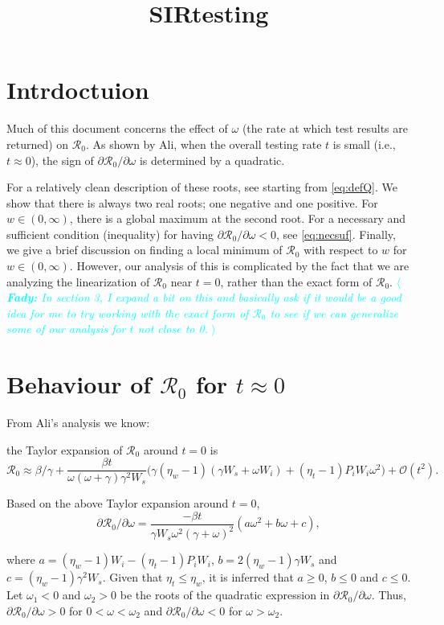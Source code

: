 \documentclass{article}
\title{SIRtesting}
\newcommand{\fady}[1]{\textcolor{cyan}{$\langle${\slshape{\bfseries Fady:} #1 }$\rangle$}}
\newcommand{\Rnum}{\mathcal{R}_0}
\begin{document}
\maketitle

\section{Intrdoctuion}

Much of this document concerns the effect of $\omega$ (the rate at which test results are returned) on $\Rnum$. As shown by Ali, when the overall testing rate $t$ is small (i.e., $t \approx 0$), the sign of $\partial{\Rnum}/\partial{\omega}$ is determined by a quadratic. 

For a relatively clean description of these roots, see starting from \cref{eq:defQ}. We show that there is always two real roots; one negative and one positive. For $w \in (0, \infty)$, there is a global maximum at the second root. For a necessary and sufficient condition (inequality) for having $\partial{\Rnum}/\partial{\omega} < 0$, see \cref{eq:necsuf}. Finally, we give a brief discussion on finding a local minimum of $\Rnum$ with respect to $w$ for $w \in (0,\infty)$. However, our analysis of this is complicated by the fact that we are analyzing the linearization of $\Rnum$ near $t = 0$, rather than the exact form of $\Rnum$. \fady{In section 3, I expand a bit on this and basically ask if it would be a good idea for me to try working with the exact form of $\Rnum$ to see if we can generalize some of our analysis for $t$ not close to 0.}

\section{Behaviour of $\Rnum$ for $t \approx 0$}

From Ali's analysis we know:

the Taylor expansion of $\Rnum$ around $t=0$ is
\begin{equation}
\Rnum \approx \beta/\gamma + \frac{\beta t}{\omega (\omega+\gamma) \gamma^2 W_s} \Big(\gamma(\eta_w-1)(\gamma W_s+\omega W_i) + (\eta_t -1)P_iW_i \omega^2 \Big) + \mathcal{O}(t^2). 
\end{equation}

Based on the above Taylor expansion around $t=0$, $$\partial{\Rnum}/\partial{\omega}=  \frac{-\beta t}{\gamma W_s\omega^2 (\gamma+\omega)^2}  (a \omega^2 + b \omega + c), $$

where $a=(\eta_w-1)W_i-(\eta_t-1)P_iW_i$, $b=2(\eta_w-1)\gamma W_s$ and $c=(\eta_w-1)\gamma^2 W_s$. Given that $\eta_t\leq \eta_w$, it is inferred that $a\geq 0$, $b\leq 0$ and $c \leq 0$. Let $\omega_1<0$ and $\omega_2>0$ be the roots of the quadratic expression in $\partial{\Rnum}/\partial{\omega}$. Thus, $\partial{\Rnum}/\partial{\omega}>0$ for $0<\omega<\omega_2$ and $\partial{\Rnum}/\partial{\omega}<0$ for $\omega>\omega_2$.
\end{document}
